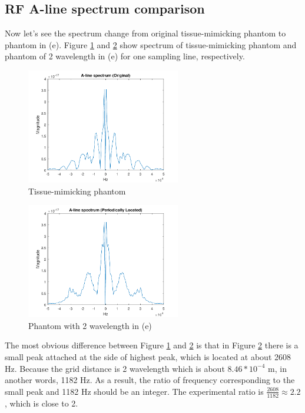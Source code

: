 \documentclass{article}
\begin{document}
\subsection{RF A-line spectrum comparison}
Now let's see the spectrum change from original tissue-mimicking phantom to phantom in (e). Figure \ref{fig:aline-origin} and 
\ref{fig:aline-e} show spectrum of tissue-mimicking phantom and phantom of 2 wavelength in (e) for one sampling line, respectively.
\begin{figure}[H]
	\centering
	\includegraphics[width = 0.6\textwidth]{src/spect_line_ori.pdf}
	\caption{Tissue-mimicking phantom}
	\label{fig:aline-origin}
\end{figure}
\begin{figure}[H]
	\centering
	\includegraphics[width = 0.6\textwidth]{src/spect_line.pdf}
	\caption{Phantom with 2 wavelength in (e)}
	\label{fig:aline-e}
\end{figure}
The most obvious difference between Figure \ref{fig:aline-origin} and \ref{fig:aline-e} is that in Figure \ref{fig:aline-e} there is a 
small peak attached at the side of highest peak, which is located at about 2608 Hz. Because the grid distance is 2 wavelength which is 
about $8.46 * 10^{-4}$ m, in another words, 1182 Hz. As a result, the ratio of frequency corresponding to the small peak and 1182 Hz should be
an integer. The experimental ratio is $\frac{2608}{1182} \approx 2.2$, which is close to 2.
\end{document}
